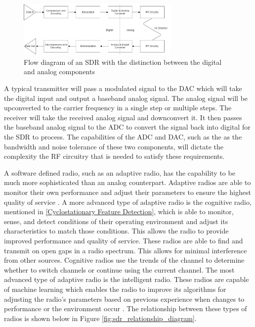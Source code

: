 \begin{figure}[ht]
\centering
\includegraphics[width=0.70\textwidth]{img/sdr_diagram.png}
\caption{Flow diagram of an SDR with the distinction between the digital and analog components}
\label{fig:sdr_flow_diagram}
\end{figure}\par
A typical transmitter will pass a modulated signal to the DAC which will take the digital input and output a baseband analog signal. The analog signal will be upconverted to the carrier frequency in a single step or multiple steps. The receiver will take the received analog signal and downconvert it. It then passes the baseband analog signal to the ADC to convert the signal back into digital for the SDR to process. The capabilities of the ADC and DAC, such as the as the bandwidth and noise tolerance of these two components, will dictate the complexity the RF circuitry that is needed to satisfy these requirements.\par
A software defined radio, such as an adaptive radio, has the capability to be much more sophisticated than an analog counterpart. Adaptive radios are able to monitor their own performance and adjust their parameters to ensure the highest quality of service \cite{cog_radios}. A more advanced type of adaptive radio is the cognitive radio, mentioned in \ref{Cyclostationary Feature Detection}, which is able to monitor, sense, and detect conditions of their operating environment and adjust its characteristics to match those conditions. This allows the radio to provide improved performance and quality of service. These radios are able to find and transmit on open gaps in a radio spectrum. This allows for minimal interference from other sources. Cognitive radios use the trends of the channel to determine whether to switch channels or continue using the current channel. The most advanced type of adaptive radio is the intelligent radio. These radios are capable of machine learning which enables the radio to improve its algorithms for adjusting the radio's parameters based on previous experience when changes to performance or the environment occur \cite{int_radio}. The relationship between these types of radios is shown below in Figure \ref{fig:sdr_relationship_diagram}.
